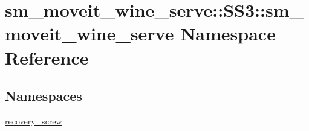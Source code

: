 \hypertarget{namespacesm__moveit__wine__serve_1_1SS3_1_1sm__moveit__wine__serve}{}\section{sm\+\_\+moveit\+\_\+wine\+\_\+serve\+:\+:S\+S3\+:\+:sm\+\_\+moveit\+\_\+wine\+\_\+serve Namespace Reference}
\label{namespacesm__moveit__wine__serve_1_1SS3_1_1sm__moveit__wine__serve}
\subsection*{Namespaces}
\begin{DoxyCompactItemize}
\item 
 \hyperlink{namespacesm__moveit__wine__serve_1_1SS3_1_1sm__moveit__wine__serve_1_1recovery__screw}{recovery\+\_\+screw}
\end{DoxyCompactItemize}

